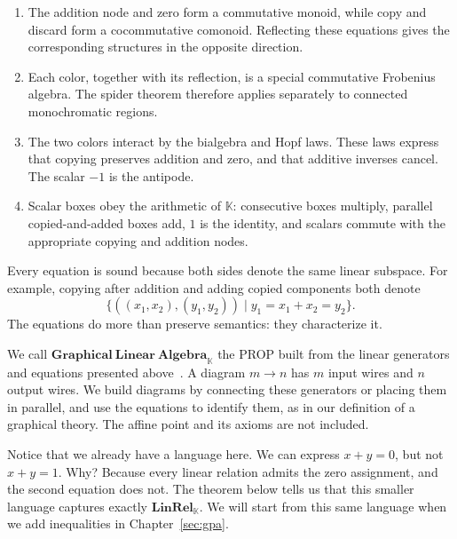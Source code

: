 \begin{enumerate}[label=\textnormal{(\roman*)}]
    \item The addition node and zero form a commutative monoid, while copy and
    discard form a cocommutative comonoid.  Reflecting these equations gives
    the corresponding structures in the opposite direction.

    \item Each color, together with its reflection, is a special commutative
    Frobenius algebra.  The spider theorem therefore applies separately to
    connected monochromatic regions.

    \item The two colors interact by the bialgebra and Hopf laws.  These laws
    express that copying preserves addition and zero, and that additive
    inverses cancel.  The scalar $-1$ is the antipode.

    \item Scalar boxes obey the arithmetic of $\mathbb K$: consecutive boxes
    multiply, parallel copied-and-added boxes add, $1$ is the identity, and
    scalars commute with the appropriate copying and addition nodes.

\end{enumerate}

Every equation is sound because both sides denote the same linear subspace.
For example, copying after addition and adding copied components both denote
\[
 \{((x_1,x_2),(y_1,y_2))\mid
       y_1=x_1+x_2=y_2\}.
\]
The equations do more than preserve semantics: they characterize it.

\begin{definition}\label{def:linear-syntax}
We call $\mathbf{Graphical\ Linear\ Algebra}_{\mathbb K}$ the PROP built from
 the linear generators and equations presented above~\cite{bonchi2017interacting}.
 A diagram $m\to n$ has $m$ input wires and $n$ output wires. We build
 diagrams by connecting these generators or placing them in parallel,
 and use the equations to identify them, as in our definition of a
 graphical theory. The affine point and its axioms are not included.
\end{definition}

Notice that we already have a language here.
We can express $x+y=0$, but not $x+y=1$. Why? Because every linear relation
admits the zero assignment, and the second equation does not. The theorem
below tells us that this smaller language captures exactly
$\mathbf{LinRel}_{\mathbb K}$. We will start from this same language when
we add inequalities in Chapter~\ref{sec:gpa}.

